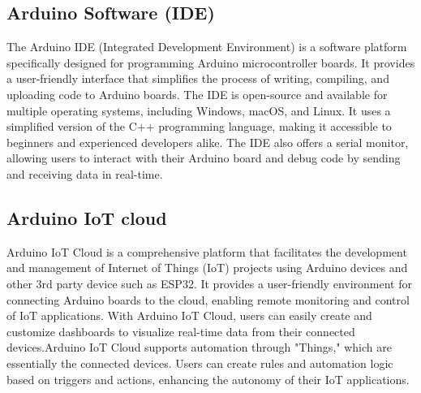 \documentclass[12pt,a4paper]{report}
\begin{document}
	\subsection{Arduino Software (IDE)}
	
	\begin{justify}
		The Arduino IDE (Integrated Development Environment) is a software platform specifically designed for programming Arduino microcontroller boards. It provides a user-friendly interface that simplifies the process of writing, compiling, and uploading code to Arduino boards. The IDE is open-source and available for multiple operating systems, including Windows, macOS, and Linux. It uses a simplified version of the C++ programming language, making it accessible to beginners and experienced developers alike. The IDE also offers a serial monitor, allowing users to interact with their Arduino board and debug code by sending and receiving data in real-time. 
	\end{justify}


	
	\subsection{Arduino IoT cloud }
	
	\begin{justify}
		
	
Arduino IoT Cloud is a comprehensive platform that facilitates the development and management of Internet of Things (IoT) projects using Arduino devices and other 3rd party device such as ESP32. It provides a user-friendly environment for connecting Arduino boards to the cloud, enabling remote monitoring and control of IoT applications. With Arduino IoT Cloud, users can easily create and customize dashboards to visualize real-time data from their connected devices.Arduino IoT Cloud supports automation through "Things," which are essentially the connected devices. Users can create rules and automation logic based on triggers and actions, enhancing the autonomy of their IoT applications.
	\end{justify}
	
	
	
	
	
	
\end{document}
